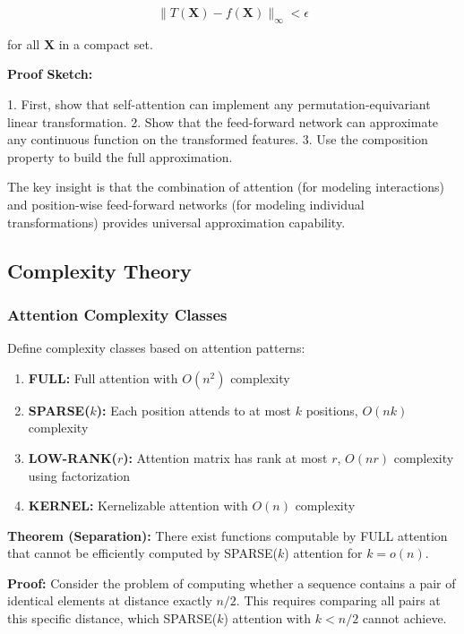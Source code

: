 \documentclass[11pt]{article}
\begin{document}
\begin{equation}
\|T(\mathbf{X}) - f(\mathbf{X})\|_{\infty} < \epsilon
\end{equation}

for all $\mathbf{X}$ in a compact set.

\textbf{Proof Sketch:}

1. First, show that self-attention can implement any permutation-equivariant linear transformation.
2. Show that the feed-forward network can approximate any continuous function on the transformed features.
3. Use the composition property to build the full approximation.

The key insight is that the combination of attention (for modeling interactions) and position-wise feed-forward networks (for modeling individual transformations) provides universal approximation capability.

\subsection{Complexity Theory}

\subsubsection{Attention Complexity Classes}

Define complexity classes based on attention patterns:

\begin{enumerate}
    \item \textbf{FULL:} Full attention with $O(n^2)$ complexity
    \item \textbf{SPARSE($k$):} Each position attends to at most $k$ positions, $O(nk)$ complexity
    \item \textbf{LOW-RANK($r$):} Attention matrix has rank at most $r$, $O(nr)$ complexity using factorization
    \item \textbf{KERNEL:} Kernelizable attention with $O(n)$ complexity
\end{enumerate}

\textbf{Theorem (Separation):} There exist functions computable by FULL attention that cannot be efficiently computed by SPARSE($k$) attention for $k = o(n)$.

\textbf{Proof:} Consider the problem of computing whether a sequence contains a pair of identical elements at distance exactly $n/2$. This requires comparing all pairs at this specific distance, which SPARSE($k$) attention with $k < n/2$ cannot achieve.
\end{document}
